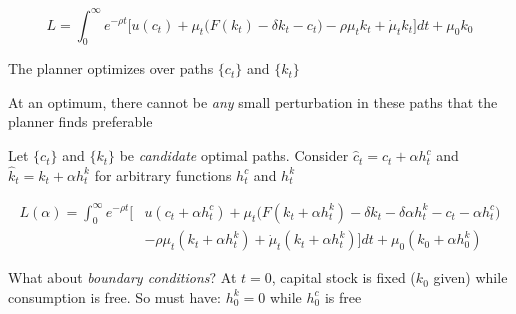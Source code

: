 \documentclass[11pt, aspectratio=169]{beamer}
\newenvironment{witemize}{\itemize\addtolength{\itemsep}{10pt}}{\enditemize}
\begin{document}
\begin{frame}{}
\begin{equation*}
L = \int_0^\infty e^{-\rho t} \bigg[ u(c_t) + \mu_t \bigg( F(k_t) - \delta k_t - c_t \bigg) - \rho \mu_t k_t + \dot \mu_t k_t \bigg] dt + \mu_0 k_0
\end{equation*}

\begin{witemize}
\item The planner optimizes over paths $\{ c_t \}$ and $\{ k_t \}$

\item At an optimum, there cannot be \textit{any} small perturbation in these paths that the planner finds preferable

\item Let $\{ c_t \}$ and $\{ k_t \}$ be \textit{candidate} optimal paths. Consider $\hat c_t = c_t + \alpha h_t^c$ and $\hat k_t = k_t + \alpha h_t^k$ for arbitrary functions $h_t^c$ and $h_t^k$
\end{witemize}


\vspace{-2mm}
\begin{align*}
L(\alpha) = \int_0^\infty e^{-\rho t} \bigg[ &u(c_t + \alpha h_t^c) + \mu_t \bigg( F(k_t + \alpha h_t^k) - \delta k_t - \delta \alpha h_t^k - c_t - \alpha h_t^c \bigg) \\
&- \rho \mu_t (k_t + \alpha h_t^k) + \dot \mu_t (k_t + \alpha h_t^k) \bigg] dt + \mu_0 (k_0 + \alpha h_0^k)
\end{align*}

\vspace{-2mm}
\begin{witemize}
\item What about \textit{boundary conditions}? At $t=0$, capital stock is fixed ($k_0$ given) while consumption is free. So must have: $h_0^k = 0$ while $h_0^c$ is free
\end{witemize}
\end{frame}
\end{document}
